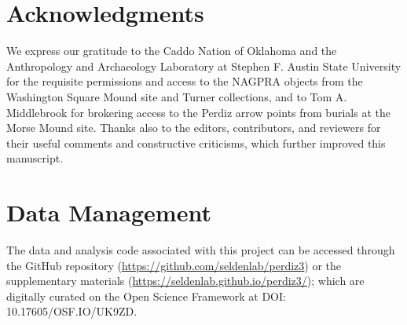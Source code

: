 \documentclass[smallextended]{svjour3}       %
\begin{document}
\hypertarget{acknowledgments}{%
\section*{Acknowledgments}\label{acknowledgments}}

We express our gratitude to the Caddo Nation of Oklahoma and the
Anthropology and Archaeology Laboratory at Stephen F. Austin State
University for the requisite permissions and access to the NAGPRA
objects from the Washington Square Mound site and Turner collections,
and to Tom A. Middlebrook for brokering access to the Perdiz arrow
points from burials at the Morse Mound site. Thanks also to the editors,
contributors, and reviewers for their useful comments and constructive
criticisms, which further improved this manuscript.

\hypertarget{data-management}{%
\section*{Data Management}\label{data-management}}

The data and analysis code associated with this project can be accessed
through the GitHub repository
(\url{https://github.com/seldenlab/perdiz3}) or the supplementary
materials (\url{https://seldenlab.github.io/perdiz3/}); which are
digitally curated on the Open Science Framework at \newline DOI:
10.17605/OSF.IO/UK9ZD.




\end{document}

